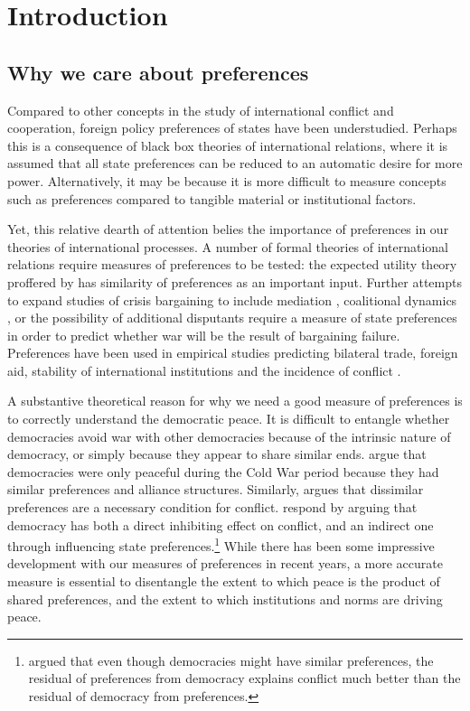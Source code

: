 \section*{Introduction}

\subsection*{Why we care about preferences}

Compared to other concepts in the study of international conflict and cooperation, foreign policy preferences of states have been understudied. Perhaps this is a consequence of black box theories of international relations, where it is assumed that all state preferences can be reduced to an automatic desire for more power. Alternatively, it may be because it is more difficult to measure concepts such as preferences compared to tangible material or institutional factors.

Yet, this relative dearth of attention belies the importance of preferences in our theories of international processes. A number of formal theories of international relations require measures of preferences to be tested: the expected utility theory proffered by \citep{buenodemesquita:1983} has similarity of preferences as an important input. Further attempts to expand studies of crisis bargaining to include mediation \citep{kydd:2003}, coalitional dynamics \citep{wolford:2014}, or the possibility of additional disputants \citep{gallop:2017} require a measure of state preferences in order to predict whether war will be the result of bargaining failure. Preferences have been used in empirical studies predicting bilateral trade, foreign aid, stability of international institutions and the incidence of conflict \citep{derouen:heo:2004, stone:2004, gartzke:2007, kastner:2007, braumoeller:2008}. 

A substantive theoretical reason for why we need a good measure of preferences is to correctly understand the democratic peace. It is difficult to entangle whether democracies avoid war with other democracies because of the intrinsic nature of democracy, or simply because they appear to share similar ends. \citet{farber:gowa:1995} argue that democracies were only peaceful during the Cold War period because they had similar preferences and alliance structures. Similarly, \citet{gartzke:1998} argues that dissimilar preferences are a necessary condition for conflict. \citet{oneal:russett:1999e} respond by arguing that democracy has both a direct inhibiting effect on conflict, and an indirect one through influencing state preferences.\footnote{\citet{gartzke:2000} argued that even though democracies might have similar preferences, the residual of preferences from democracy explains conflict much better than the residual of democracy from preferences.} While there has been some impressive development with our measures of preferences in recent years, a more accurate measure is essential to disentangle the extent to which peace is the product of shared preferences, and the extent to which institutions and norms are driving peace.

